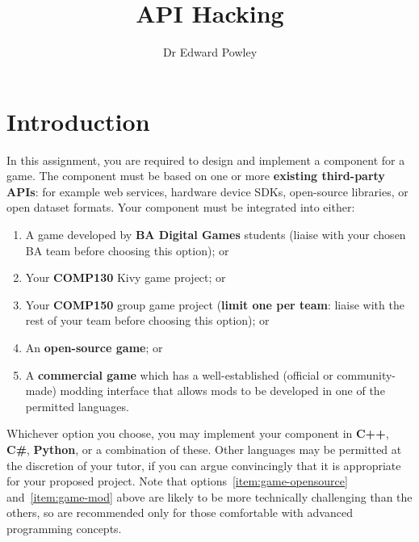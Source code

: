 \documentclass{../fal_assignment}
\title{API Hacking}
\author{Dr Edward Powley}
\begin{document}
\maketitle
%    
\section*{Introduction}

In this assignment, you are required to design and implement a component for a game.
The component must be based on one or more \textbf{existing third-party APIs}:
for example web services, hardware device SDKs, open-source libraries, or open dataset formats.
Your component must be integrated into either:
\begin{enumerate}[label=(\alph*)]
    \item A game developed by \textbf{BA Digital Games} students (liaise with your chosen BA team before choosing this option); or
    \item Your \textbf{COMP130} Kivy game project; or
    \item Your \textbf{COMP150} group game project (\textbf{limit one per team}: liaise with the rest of your team before choosing this option); or
    \item \label{item:game-opensource} An \textbf{open-source game}; or
    \item \label{item:game-mod} A \textbf{commercial game} which has a well-established (official or community-made) modding interface that allows mods to be developed in one of the permitted languages.
\end{enumerate}
Whichever option you choose, you may implement your component in \textbf{C++}, \textbf{C\#}, \textbf{Python}, or a combination of these.
Other languages may be permitted at the discretion of your tutor, if you can argue convincingly that it is appropriate for your proposed project.
Note that options~\ref{item:game-opensource} and~\ref{item:game-mod} above are likely to be more technically challenging than the others,
so are recommended only for those comfortable with advanced programming concepts.
\end{document}
